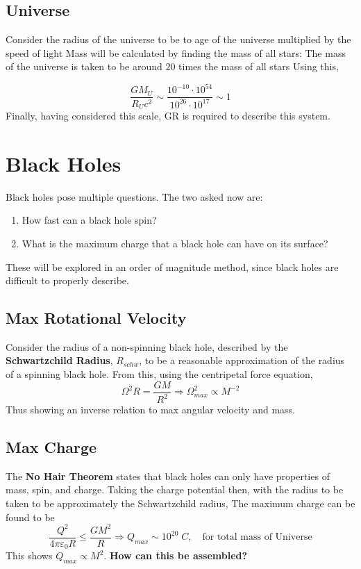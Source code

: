 \subsection{Universe}
Consider the radius of the universe to be to age of the universe multiplied by the speed of light
Mass will be calculated by finding the mass of all stars:
The mass of the universe is taken to be around $20$ times the mass of all stars
Using this,

$$ \frac{GM_U}{R_U c^2} \sim \frac{10^{-10} \cdot 10^{54}}{10^{26} \cdot 10^{17}} \sim 1 $$
Finally, having considered this scale, GR is required to describe this system.

\section{Black Holes}
Black holes pose multiple questions. The two asked now are:
\begin{enumerate}
    \item How fast can a black hole spin?
    \item What is the maximum charge that a black hole can have on its surface?
\end{enumerate}
These will be explored in an order of magnitude method, since black holes are difficult to properly describe.
\subsection{Max Rotational Velocity}
Consider the radius of a non-spinning black hole, described by the \textbf{Schwartzchild Radius}, $R_{schw}$, to be a reasonable approximation of the radius of a spinning black hole.
From this, using the centripetal force equation,
$$ \Omega^2 R = \frac{GM}{R^2} \Rightarrow \Omega^2_{max} \propto M^{-2} $$
Thus showing an inverse relation to max angular velocity and mass.

\subsection{Max Charge}
The \textbf{No Hair Theorem} states that black holes can only have properties of mass, spin, and charge. Taking the charge potential then, with the radius to be taken to be approximately the Schwartzchild radius, The maximum charge can be found to be 
$$ \frac{Q^2}{4 \pi \varepsilon_0 R} \leq \frac{GM^2}{R}  \Rightarrow Q_{max} \sim 10^{20} \; C, \quad \text{for total mass of Universe} $$
This shows $Q_{max} \propto M^2$. \textbf{How can this be assembled?}


